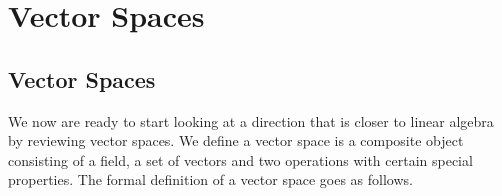 \documentclass{report}
\begin{document}
    \tableofcontents

    \pagebreak
    \chapter{ Vector Spaces }

    \section{Vector Spaces}

    We now are ready to start looking at a direction that is closer to linear algebra by reviewing vector spaces. We define a vector space is a composite object consisting of a field, a set of vectors and two operations with certain special properties. The formal definition of a vector space goes as follows.
\end{document}
